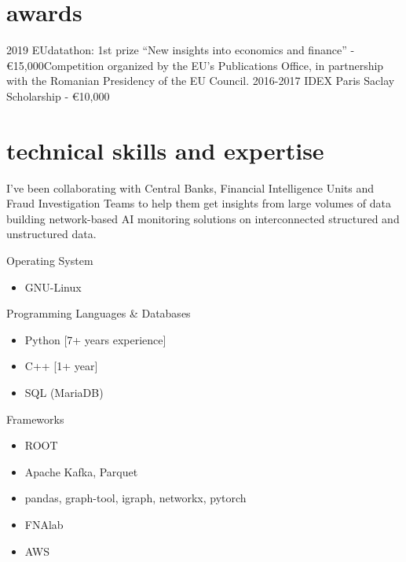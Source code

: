 \documentclass[]{cv-style}     %
\begin{document}
\section{awards}
\par\vspace{.5\parskip}%
\begin{entrylist}
\entry
{2019}
{EUdatathon: 1st prize ``New insights into economics and finance'' - \euro 15,000}{}{Competition organized by the EU’s Publications Office, in partnership with the Romanian Presidency of the EU Council.}
\entry
{2016-2017}
{IDEX Paris Saclay Scholarship - \euro 10,000}{}{}
\end{entrylist}

\section{technical skills and expertise}
I've been collaborating with Central Banks, Financial Intelligence Units and Fraud Investigation Teams to help them get insights from large volumes of data building network-based AI monitoring solutions on interconnected structured and unstructured data.
\par\vspace{.5\parskip}%
 {\color{gray}\headingfont Operating System}
 \begin{itemize}
  \item GNU-Linux
 \end{itemize}
 {\color{gray}\headingfont Programming Languages \& Databases}
 \begin{itemize}
  \item Python [7+ years experience]
  \item C++ [1+ year]
  \item SQL (MariaDB)
 \end{itemize}
 {\color{gray}\headingfont Frameworks}
 \begin{itemize}
  \item ROOT
  \item Apache Kafka, Parquet
  \item pandas, graph-tool, igraph, networkx, pytorch
  \item FNAlab
  \item AWS
 \end{itemize}

\end{document}
